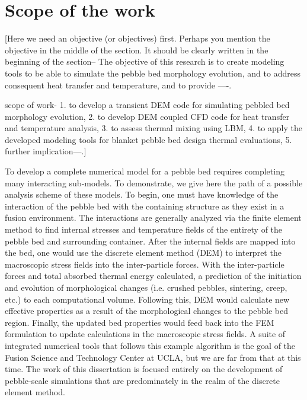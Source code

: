 \section{Scope of the work}\label{sec:intro-scope-of-work}
[Here we need an objective (or objectives) first. Perhaps you mention the objective in the middle of the section. It should be clearly written in the beginning of the section-- The objective of this research is to create modeling tools to be able to simulate the pebble bed morphology evolution, and to address consequent heat transfer and temperature, and to provide ----. 

scope of work- 1. to develop a transient DEM code for simulating pebbled bed morphology evolution, 2. to develop DEM coupled CFD code for heat transfer and temperature analysis, 3. to assess thermal mixing using LBM, 4. to apply the developed modeling tools for blanket pebble bed design thermal evaluations, 5. further implication---.]




To develop a complete numerical model for a pebble bed requires completing many interacting sub-models. To demonstrate, we give here the path of a possible analysis scheme of these models. To begin, one must have knowledge of the interaction of the pebble bed with the containing structure as they exist in a fusion environment. The interactions are generally analyzed via the finite element method to find internal stresses and temperature fields of the entirety of the pebble bed and surrounding container. After the internal fields are mapped into the bed, one would use the discrete element method (DEM) to interpret the macroscopic stress fields into the inter-particle forces. With the inter-particle forces and total absorbed thermal energy calculated, a prediction of the initiation and evolution of morphological changes (i.e. crushed pebbles, sintering, creep, etc.) to each computational volume. Following this, DEM would calculate new effective properties as a result of the morphological changes to the pebble bed region. Finally, the updated bed properties would feed back into the FEM formulation to update calculations in the macroscopic stress fields. A suite of integrated numerical tools that follows this example algorithm is the goal of the Fusion Science and Technology Center at UCLA, but we are far from that at this time. The work of this dissertation is focused entirely on the development of pebble-scale simulations that are predominately in the realm of the discrete element method.

